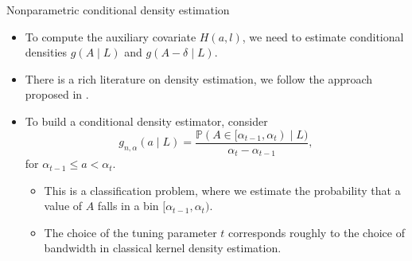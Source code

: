 \documentclass{beamer}
\newcommand{\pr}{\mathbb{P}}
\begin{document}

\begin{frame}[c]{Nonparametric conditional density estimation}

\begin{center}
\begin{itemize}
  \itemsep8pt
  \item To compute the auxiliary covariate $H(a,l)$, we need to estimate
    conditional densities $g(A \mid L)$ and $g(A - \delta \mid L)$.
  \item There is a rich literature on density estimation, we follow the approach
    proposed in \cite{diaz2011super}.
  \item To build a conditional density estimator, consider
    \begin{equation*}
      g_{n, \alpha}(a \mid L) = \frac{\pr (A \in [\alpha_{t-1}, \alpha_t)
        \mid L)}{\alpha_t - \alpha_{t-1}},
    \end{equation*}
    for $\alpha_{t-1} \leq a < \alpha_t$.
    \vspace{0.5em}
    \begin{itemize}
      \itemsep4pt
      \item This is a classification problem, where we estimate the probability
        that a value of $A$ falls in a bin $[\alpha_{t-1}, \alpha_t)$.
      \item The choice of the tuning parameter $t$ corresponds roughly to the
        choice of bandwidth in classical kernel density estimation.
    \end{itemize}
\end{itemize}
\end{center}

\note{
}

\end{frame}

\end{document}
